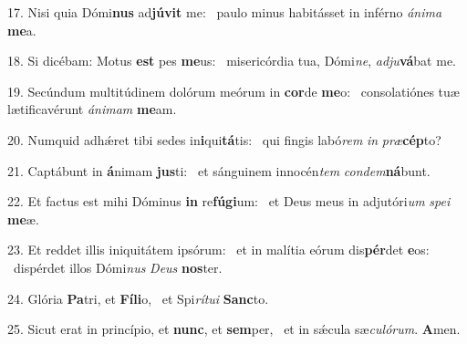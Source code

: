 17. Nisi quia Dómi\textbf{nus} ad\textbf{jú}\textbf{vit} me: \ast\  paulo minus habitásset in inférno \textit{á}\textit{ni}\textit{ma} \textbf{me}a.\

18. Si dicébam: Motus \textbf{est} pes \textbf{me}us: \ast\  misericórdia tua, Dómi\textit{ne}, \textit{ad}\textit{ju}\textbf{vá}bat me.\

19. Secúndum multitúdinem dolórum meórum in \textbf{cor}de \textbf{me}o: \ast\  consolatiónes tuæ lætificavérunt \textit{á}\textit{ni}\textit{mam} \textbf{me}am.\

20. Numquid adhǽret tibi sedes in\textbf{i}qui\textbf{tá}tis: \ast\  qui fingis labó\textit{rem} \textit{in} \textit{præ}\textbf{cép}to?\

21. Captábunt in \textbf{á}nimam \textbf{jus}ti: \ast\  et sánguinem innocén\textit{tem} \textit{con}\textit{dem}\textbf{ná}bunt.\

22. Et factus est mihi Dóminus \textbf{in} re\textbf{fú}\textbf{gi}um: \ast\  et Deus meus in adjutóri\textit{um} \textit{spe}\textit{i} \textbf{me}æ.\

23. Et reddet illis iniquitátem ipsórum: \dag\  et in malítia eórum dis\textbf{pér}det \textbf{e}os: \ast\  dispérdet illos Dómi\textit{nus} \textit{De}\textit{us} \textbf{nos}ter.\

24. Glória \textbf{Pa}tri, et \textbf{Fí}\textbf{li}o, \ast\  et Spi\textit{rí}\textit{tu}\textit{i} \textbf{Sanc}to.\

25. Sicut erat in princípio, et \textbf{nunc}, et \textbf{sem}per, \ast\  et in sǽcula sæ\textit{cu}\textit{ló}\textit{rum}. \textbf{A}men.\

